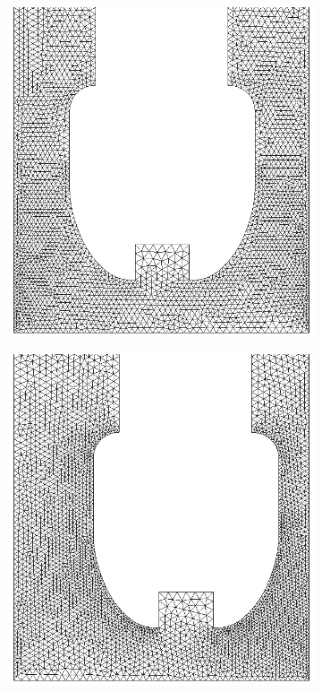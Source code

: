 \begin{figure}[H]
\begin{subfigure}[b]{0.1\linewidth}
	\end{subfigure}
	\\
	\begin{subfigure}[b]{0.3\linewidth}
		\includegraphics[width=\linewidth]{img/lisa_sapata.png}
	\end{subfigure}
	\quad
	\quad
	\quad
	\quad
	\quad
	\begin{subfigure}[b]{0.3\linewidth}
		\includegraphics[width=\linewidth]{img/lisa_standoff_sapata.png}
	\end{subfigure}


\end{figure}
